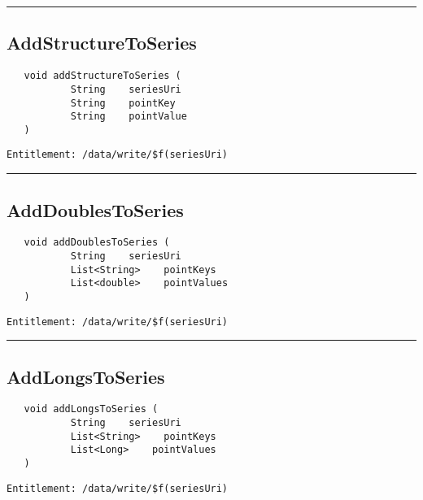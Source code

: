 \rule{12cm}{2pt}
\subsection{AddStructureToSeries}
\label{Api:AddStructureToSeries}
\begin{verbatim}
   void addStructureToSeries (
           String    seriesUri
           String    pointKey
           String    pointValue
   )
\end{verbatim}
\begin{Verbatim}[fontsize=\small, formatcom=\color{Maroon}]
  Entitlement: /data/write/$f(seriesUri)
\end{Verbatim}



\rule{12cm}{2pt}
\subsection{AddDoublesToSeries}
\label{Api:AddDoublesToSeries}
\begin{verbatim}
   void addDoublesToSeries (
           String    seriesUri
           List<String>    pointKeys
           List<double>    pointValues
   )
\end{verbatim}
\begin{Verbatim}[fontsize=\small, formatcom=\color{Maroon}]
  Entitlement: /data/write/$f(seriesUri)
\end{Verbatim}



\rule{12cm}{2pt}
\subsection{AddLongsToSeries}
\label{Api:AddLongsToSeries}
\begin{verbatim}
   void addLongsToSeries (
           String    seriesUri
           List<String>    pointKeys
           List<Long>    pointValues
   )
\end{verbatim}
\begin{Verbatim}[fontsize=\small, formatcom=\color{Maroon}]
  Entitlement: /data/write/$f(seriesUri)
\end{Verbatim}



